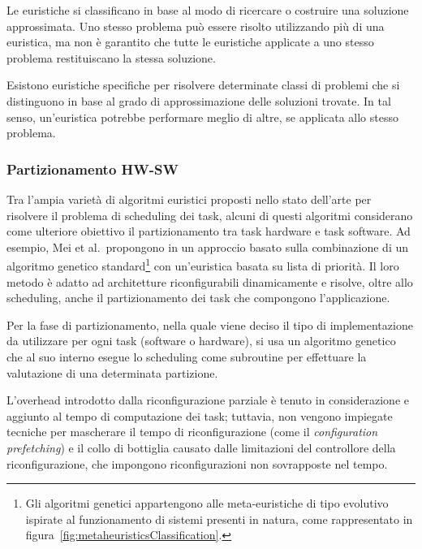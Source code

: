 Le euristiche si classificano in base al modo di ricercare o costruire una soluzione 
approssimata.
Uno stesso problema può essere risolto utilizzando più di una 
euristica, ma non è garantito che tutte le euristiche applicate a uno stesso 
problema restituiscano la stessa soluzione.

Esistono euristiche specifiche per risolvere determinate classi di problemi che 
si distinguono in base al grado di approssimazione delle soluzioni trovate. 
In tal senso, un'euristica potrebbe performare meglio di altre, se applicata 
allo stesso problema.

\subsubsection{Partizionamento HW-SW}
Tra l'ampia varietà di algoritmi euristici proposti nello stato dell'arte per 
risolvere il problema di scheduling dei task, alcuni di questi algoritmi 
considerano come ulteriore obiettivo il partizionamento tra task hardware e 
task software. Ad esempio, Mei et al.~propongono in 
\cite{MeiPartitioningScheduling} un approccio basato sulla combinazione di un 
algoritmo genetico standard\footnote{Gli algoritmi genetici appartengono alle 
meta-euristiche di tipo evolutivo ispirate al funzionamento di sistemi presenti 
in natura, come rappresentato in figura~\ref{fig:metaheuristicsClassification}.}
con un'euristica basata su lista di priorità. Il loro metodo è adatto ad
architetture riconfigurabili dinamicamente e risolve, oltre allo scheduling,
anche il partizionamento dei task che compongono l'applicazione.

Per la fase di partizionamento, nella quale viene deciso il tipo 
di implementazione da utilizzare per ogni task (software o hardware), si usa un 
algoritmo genetico che al suo interno esegue lo scheduling come subroutine per 
effettuare la valutazione di una determinata partizione.


L'overhead introdotto dalla riconfigurazione parziale è tenuto in 
considerazione e aggiunto al tempo di computazione dei task; tuttavia, non 
vengono impiegate tecniche per mascherare il tempo di riconfigurazione (come il 
\emph{configuration prefetching}) e il collo di bottiglia causato dalle 
limitazioni del controllore della riconfigurazione, che impongono 
riconfigurazioni non sovrapposte nel tempo.


